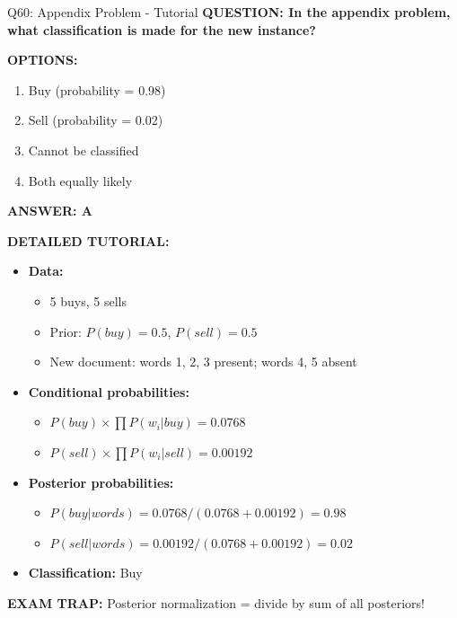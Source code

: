 \documentclass[8pt]{beamer}
\begin{document}
	\begin{frame}{Q60: Appendix Problem - Tutorial}
		\fontsize{6.5}{7.5}\selectfont
		\textbf{QUESTION: In the appendix problem, what classification is made for the new instance?}
		
		\vspace{0.1cm}
		\textbf{OPTIONS:}
		\begin{enumerate}
			\item Buy (probability = 0.98)
			\item Sell (probability = 0.02)
			\item Cannot be classified
			\item Both equally likely
		\end{enumerate}
		
		\vspace{0.1cm}
		\textcolor{myblue}{\textbf{ANSWER: A}}
		
		\vspace{0.1cm}
		\textbf{DETAILED TUTORIAL:}
		\begin{itemize}
			\item \textbf{Data:}
			\begin{itemize}
				\item 5 buys, 5 sells
				\item Prior: $P(buy) = 0.5$, $P(sell) = 0.5$
				\item New document: words 1, 2, 3 present; words 4, 5 absent
			\end{itemize}
			\item \textbf{Conditional probabilities:}
			\begin{itemize}
				\item $P(buy) \times \prod P(w_i|buy) = 0.0768$
				\item $P(sell) \times \prod P(w_i|sell) = 0.00192$
			\end{itemize}
			\item \textbf{Posterior probabilities:}
			\begin{itemize}
				\item $P(buy|words) = 0.0768 / (0.0768 + 0.00192) = 0.98$
				\item $P(sell|words) = 0.00192 / (0.0768 + 0.00192) = 0.02$
			\end{itemize}
			\item \textbf{Classification:} Buy
		\end{itemize}
		
		\textcolor{myred}{\textbf{EXAM TRAP:}} Posterior normalization = \textcolor{myblue}{divide by sum of all posteriors}!
	\end{frame}
	
\end{document}
